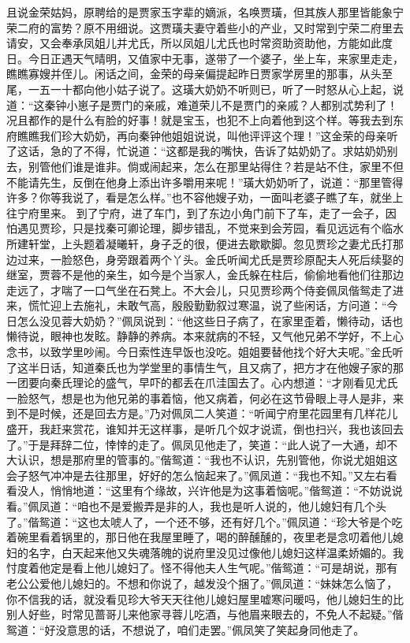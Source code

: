 \documentclass[12pt,oneside]{book}
\begin{document}
且说金荣姑妈，原聘给的是贾家玉字辈的嫡派，名唤贾璜，但其族人那里皆能象宁荣二府的富势？原不用细说。这贾璜夫妻守着些小的产业，又时常到宁荣二府里去请安，又会奉承凤姐儿并尤氏，所以凤姐儿尤氏也时常资助资助他，方能如此度日。今日正遇天气晴明，又值家中无事，遂带了一个婆子，坐上车，来家里走走，瞧瞧寡嫂并侄儿。闲话之间，金荣的母亲偏提起昨日贾家学房里的那事，从头至尾，一五一十都向他小姑子说了。这璜大奶奶不听则已，听了一时怒从心上起，说道：“这秦钟小崽子是贾门的亲戚，难道荣儿不是贾门的亲戚？人都别忒势利了！况且都作的是什么有脸的好事！就是宝玉，也犯不上向着他到这个样。等我去到东府瞧瞧我们珍大奶奶，再向秦钟他姐姐说说，叫他评评这个理！”这金荣的母亲听了这话，急的了不得，忙说道：“这都是我的嘴快，告诉了姑奶奶了。求姑奶奶别去，别管他们谁是谁非。倘或闹起来，怎么在那里站得住？若是站不住，家里不但不能请先生，反倒在他身上添出许多嚼用来呢！”璜大奶奶听了，说道：“那里管得许多？你等我说了，看是怎么样。”也不容他嫂子劝，一面叫老婆子瞧了车，就坐上往宁府里来。
到了宁府，进了车门，到了东边小角门前下了车，走了一会子，因怕遇见贾珍，只是找秦可卿论理，脚步错乱，不觉来到会芳园，看见远远有个临水所建轩堂，上头题着凝曦轩，身子乏的很，便进去歇歇脚。忽见贾珍之妻尤氏打那边过来，一脸怒色，身旁跟着两个丫头。金氏听闻尤氏是贾珍原配夫人死后续娶的继室，贾蓉不是他的亲生，如今是个当家人，金氏躲在柱后，偷偷地看他们往那边走远了，才喘了一口气坐在石凳上。不大会儿，只见贾珍两个侍妾佩凤偕鸳走了进来，慌忙迎上去施礼，未敢气高，殷殷勤勤叙过寒温，说了些闲话，方问道：“今日怎么没见蓉大奶奶？”佩凤说到：“他这些日子病了，在家里歪着，懒待动，话也懒待说，眼神也发眩。静静的养病。本来就病的不轻，又气他兄弟不学好，不上心念书，以致学里吵闹。今日索性连早饭也没吃。姐姐要替他找个好大夫呢。”金氏听了这半日话，知道秦氏也为学堂里的事情生气，且又病了，把方才在他嫂子家的那一团要向秦氏理论的盛气，早吓的都丢在爪洼国去了。心内想道：“才刚看见尤氏一脸怒气，想是也为他兄弟的事着恼，他又病着，何必在这节骨眼上寻人是非，来到不是时候，还是回去方是。”乃对佩凤二人笑道：“听闻宁府里花园里有几样花儿盛开，我赶来赏花，谁知并无这样事，是听几个奴才说谎，倒也扫兴，我也该回去了。”于是拜辞二位，悻悻的走了。佩凤见他走了，笑道：“此人说了一大通，却不大认识，想是那府里的管事的。”偕鸳道：“我也不认识，先别管他，你说尤姐姐这会子怒气冲冲是去往那里，好好的怎么恼起来了。”佩凤道：“我也不知。”又左右看看没人，悄悄地道：“这里有个缘故，兴许他是为这事着恼呢。”偕鸳道：“不妨说说看。”佩凤道：“咱也不是爱搬弄是非的人，我也是听人说的，他儿媳妇有几个头了。”偕鸳道：“这也太唬人了，一个还不够，还有好几个。”佩凤道：“珍大爷是个吃着碗里看着锅里的，那日他在我屋里睡了，喝的醉醺醺的，夜里老是念叨着他儿媳妇的名字，白天起来他又失魂落魄的说府里没见过像他儿媳妇这样温柔娇媚的。我忖度着他定是看上他儿媳妇了。怪不得他夫人生气呢。”偕鸳道：“可是胡说，那有老公公爱他儿媳妇的。不想和你说了，越发没个捆了。”佩凤道：“妹妹怎么恼了，你不信我的话，就没看见珍大爷天天往他儿媳妇屋里嘘寒问暖吗，他儿媳妇生的比别人好些，时常见蔷哥儿来他家寻蓉儿吃酒，与他眉来眼去的，不免人不起疑。”偕鸳道：“好没意思的话，不想说了，咱们走罢。”佩凤笑了笑起身同他走了。
\end{document}
